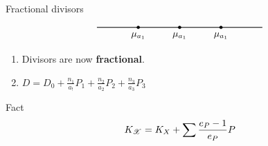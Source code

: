 \begin{frame}{Fractional divisors}



\begin{equation} \label{pic:M-curve} \notag
  \begin{tikzpicture}
    \draw[thick] (-3,0) -- (3,0);
    \filldraw[draw=black,fill=black] (-1.5,0) node [below=2pt]
    {$\mu_{a_1}$} circle (1.5pt); \filldraw[draw=black,fill=black] (0,0)
    node [below=2pt] {$\mu_{a_1}$} circle (1.5pt);
    \filldraw[draw=black,fill=black] (1.5,0) node [below=2pt] {$\mu_{a_1}$}
    circle (1.5pt);
  \end{tikzpicture}
\end{equation}

\begin{remark}
  \begin{enumerate}
  \item Divisors are now \textbf{fractional}.
  \item $D = D_0 + \frac{n_{1}}{a_!}P_1 + \frac{n_{2}}{a_2}P_2 + \frac{n_{3}}{a_3}P_{3}$
  \end{enumerate}

\end{remark}

\begin{block}{Fact}
  \[
K_{{\mathscr X}} = K_X + \sum \frac{e_P-1}{e_P} P
\]
\end{block}


\end{frame}
